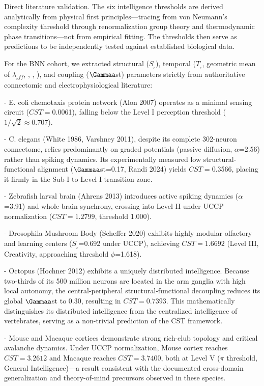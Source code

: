 \documentclass[a4paper,12pt]{article}
\begin{document}
Direct literature validation. The six intelligence thresholds are derived analytically from physical first principles---tracing from von Neumann's complexity threshold through renormalization group theory and thermodynamic phase transitions---not from empirical fitting. The thresholds then serve as predictions to be independently tested against established biological data.


For the BNN cohort, we extracted structural ($S_{_c}$), temporal ($T_{_c}$, geometric mean of $\lambda_{_eff}$, \Phi, \Psi, \Theta), and coupling ($\Gammaa$st) parameters strictly from authoritative connectomic and electrophysiological literature:


- E. coli chemotaxis protein network (Alon 2007) operates as a minimal sensing circuit ($CST = $0.0061), falling below the Level I perception threshold ($1/\sqrt{2} \approx 0.707$).


- C. elegans (White 1986, Varshney 2011), despite its complete 302-neuron connectome, relies predominantly on graded potentials (passive diffusion, $\alpha$=2.56) rather than spiking dynamics. Its experimentally measured low structural-functional alignment ($\Gammaa$st=0.17, Randi 2024) yields $CST = $0.3566, placing it firmly in the Sub-I to Level I transition zone.


- Zebrafish larval brain (Ahrens 2013) introduces active spiking dynamics ($\alpha$=3.91) and whole-brain synchrony, crossing into Level II under UCCP normalization ($CST = 1.2799$, threshold 1.000).


- Drosophila Mushroom Body (Scheffer 2020) exhibits highly modular olfactory and learning centers ($S_{_c}$=0.692 under UCCP), achieving $CST = 1.6692$ (Level III, Creativity, approaching threshold $\phi$=1.618).


- Octopus (Hochner 2012) exhibits a uniquely distributed intelligence. Because two-thirds of its 500 million neurons are located in the arm ganglia with high local autonomy, the central-peripheral structural-functional decoupling reduces its global $\Gammaa$st to 0.30, resulting in $CST = $0.7393. This mathematically distinguishes its distributed intelligence from the centralized intelligence of vertebrates, serving as a non-trivial prediction of the CST framework.


- Mouse and Macaque cortices demonstrate strong rich-club topology and critical avalanche dynamics. Under UCCP normalization, Mouse cortex reaches $CST = 3.2612$ and Macaque reaches $CST = 3.7400$, both at Level V ($\pi$ threshold, General Intelligence)---a result consistent with the documented cross-domain generalization and theory-of-mind precursors observed in these species.
\end{document}

